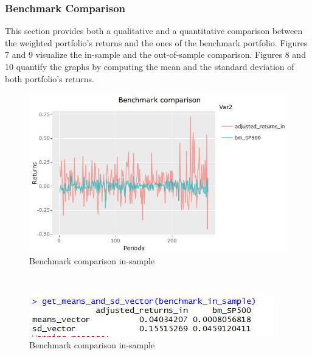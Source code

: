 \documentclass{article}
\begin{document}
\subsubsection{Benchmark Comparison}
This section provides both a qualitative and a quantitative  comparison between the weighted portfolio's returns and the ones of the benchmark portfolio. Figures 7 and 9 visualize the in-sample and the out-of-sample comparison. Figures 8 and 10 quantify the graphs by computing the mean and the standard deviation of both portfolio's returns. 
\begin {figure}[H]
    \begin{center}
    \includegraphics[scale=0.7]{Benchmark_in_sample_MV.JPG}
    \caption{Benchmark comparison in-sample}
    \end{center}
\end{figure}\\
\begin {figure}[H]
    \begin{center}
    \includegraphics[scale=0.6]{benchmark_comparison_pf_returns_quantified_summary_in_sample.PNG}
    \caption{Benchmark comparison in-sample}
    \end{center}
\end{figure}\\
\end{document}
